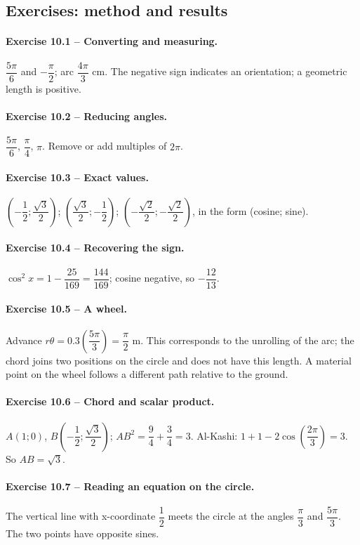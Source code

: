 \subsection*{Exercises: method and results}
\paragraph{Exercise 10.1 -- Converting and measuring.} $\dfrac{5\pi}{6}$ and $-\dfrac{\pi}{2}$; arc $\dfrac{4\pi}{3}$ cm. The negative sign indicates an orientation; a geometric length is positive.
\paragraph{Exercise 10.2 -- Reducing angles.} $\dfrac{5\pi}{6}$, $\dfrac{\pi}{4}$, $\pi$. Remove or add multiples of $2\pi$.
\paragraph{Exercise 10.3 -- Exact values.} $(-\dfrac{1}{2};\dfrac{\sqrt 3}{2})$; $(\dfrac{\sqrt 3}{2};-\dfrac{1}{2})$; $(-\dfrac{\sqrt 2}{2};-\dfrac{\sqrt 2}{2})$, in the form (cosine; sine).
\paragraph{Exercise 10.4 -- Recovering the sign.} $\cos ^2x=1-\dfrac{25}{169}=\dfrac{144}{169}$; cosine negative, so $-\dfrac{12}{13}$.
\paragraph{Exercise 10.5 -- A wheel.} Advance $r\theta =0.3(\dfrac{5\pi}{3})=\dfrac{\pi}{2}$ m. This corresponds to the unrolling of the arc; the chord joins two positions on the circle and does not have this length. A material point on the wheel follows a different path relative to the ground.
\paragraph{Exercise 10.6 -- Chord and scalar product.} $A(1;0)$, $B(-\dfrac{1}{2};\dfrac{\sqrt 3}{2})$; $AB^2=\dfrac{9}{4}+\dfrac{3}{4}=3$. Al-Kashi: $1+1-2\cos (\dfrac{2\pi}{3})=3$. So $AB=\sqrt3$.
\paragraph{Exercise 10.7 -- Reading an equation on the circle.} The vertical line with x-coordinate $\dfrac{1}{2}$ meets the circle at the angles $\dfrac{\pi}{3}$ and $\dfrac{5\pi}{3}$. The two points have opposite sines.
